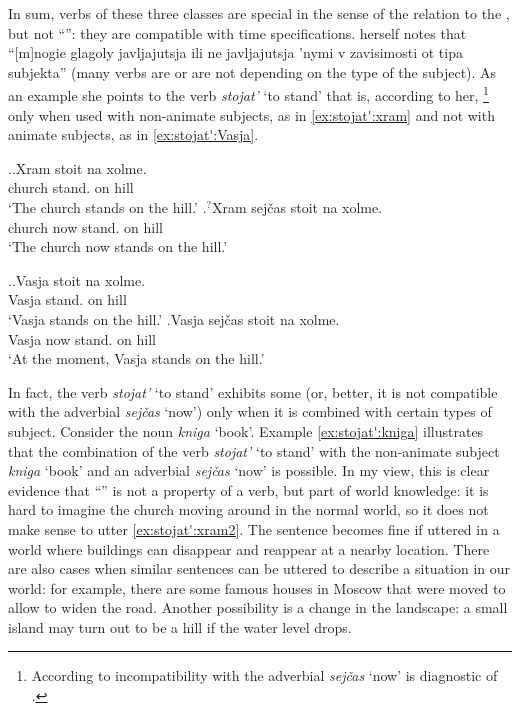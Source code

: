 In sum, verbs of these three classes are special in the sense of the relation to the , but not ``'': they are compatible with time specifications. \citet[132]{Paducheva:96} herself notes that ``[m]nogie glagoly javljajutsja ili ne javljajutsja 'nymi v zavisimosti ot tipa subjekta'' (many verbs are or are not  depending on the type of the subject). As an example she points to the verb \textit{stojat'} `to stand' that is, according to her, \footnote{According to \citet{Paducheva:96} incompatibility with the adverbial \textit{sej\v{c}as} `now' is diagnostic of .} only when used with non-animate subjects, as in \ref{ex:stojat':xram} and not with animate subjects, as in \ref{ex:stojat':Vasja}.\largerpage

\ex.\label{ex:stojat':xram}\ag.Xram stoit na xolme.\\
church stand. on hill\\
\trans `The church stands on the hill.'
\bg.\label{ex:stojat':xram2}$^?$Xram sej\v{c}as stoit na xolme.\\
church now stand. on hill\\
\trans `The church now stands on the hill.'

\ex.\label{ex:stojat':Vasja}\ag.Vasja stoit na xolme.\\
Vasja stand. on hill\\
\trans `Vasja stands on the hill.'
\bg.Vasja sej\v{c}as stoit na xolme.\\
Vasja now stand. on hill\\
\trans `At the moment, Vasja stands on the hill.'

In fact, the verb \textit{stojat'} `to stand' exhibits some  (or, better, it is not compatible with the adverbial \textit{sej\v{c}as} `now') only when it is combined with certain types of subject. Consider the noun \textit{kniga} `book'. Example \ref{ex:stojat':kniga} illustrates that the combination of the verb \textit{stojat'} `to stand' with the non-animate subject \textit{kniga} `book' and an adverbial \textit{sej\v{c}as} `now' is possible.  In my view, this is clear evidence that ``'' is not a property of a verb, but part of world knowledge: it is hard to imagine the church moving around in the normal world, so it does not make sense to utter \ref{ex:stojat':xram2}. The sentence becomes fine if uttered in a world where buildings can disappear and reappear at a nearby location. There are also cases when similar sentences can be uttered to describe a situation in our world: for example, there are some famous houses in Moscow that were moved to allow to widen the road. Another possibility is a change in the landscape: a small island may turn out to be a hill if the water level drops. 

